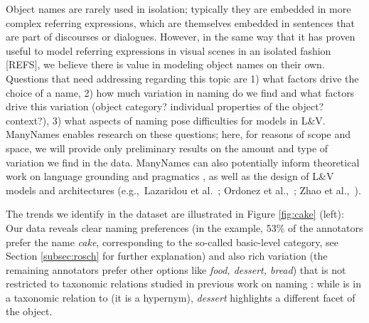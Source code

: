 Object names are rarely used in isolation; typically they are embedded in more complex referring expressions, which are themselves embedded in sentences that are part of discourses or dialogues.
However, in the same way that it has proven useful to model referring expressions in visual scenes in an isolated fashion [REFS], we believe there is value in modeling object names on their own.
Questions that need addressing regarding this topic are 1) what factors drive the choice of a name, 2) how much variation in naming do we find and what factors drive this variation (object category? individual properties of the object? context?), 3) what aspects of naming pose difficulties for models in L\&V.
ManyNames enables research on these questions; here, for reasons of scope and space, we will provide only preliminary results on the amount and type of variation we find in the data. 
ManyNames can also potentially inform theoretical work on language grounding and pragmatics \cite{rohde2012communicating,graf2016animal}, as well as the design of L\&V models and architectures (e.g.,~Lazaridou et al.~; Ordonez et al.,~; Zhao et al.,~).

The trends we identify in the dataset are illustrated in Figure \ref{fig:cake} (left): Our data reveals clear naming preferences (in the example, 53\% of the annotators prefer the name \textit{cake}, corresponding to the so-called basic-level category, see Section \ref{subsec:rosch} for further explanation) and also rich variation (the remaining annotators prefer other options like \textit{food, dessert, bread}) that is not restricted to taxonomic relations studied in previous work on naming \cite{Ordonez:2016,graf2016animal}: while  is in a taxonomic relation to  (it is a hypernym), \textit{dessert} highlights a different facet of the object.


